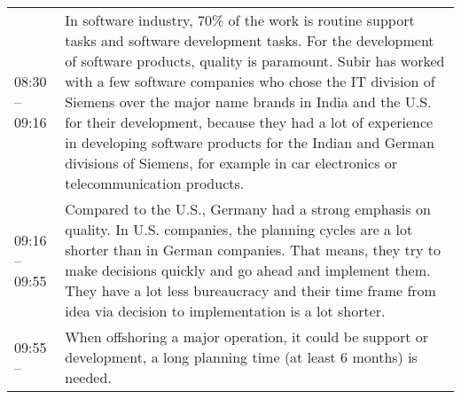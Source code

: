 \begin{appendix}
\begin{longtable}{l p{12.5cm}}
	08:30 -- 09:16&In software industry, 70\% of the work is routine support tasks and software development tasks. For the development of software products, quality is paramount. Subir has worked with a few software companies who chose the IT division of Siemens over the major name brands in India and the U.S. for their development, because they had a lot of experience in developing software products for the Indian and German divisions of Siemens, for example in car electronics or telecommunication products.\\
	09:16 -- 09:55&Compared to the U.S., Germany had a strong emphasis on quality. In U.S. companies, the planning cycles are a lot shorter than in German companies. That means, they try to make decisions quickly and go ahead and implement them. They have a lot less bureaucracy and their time frame from idea via decision to implementation is a lot shorter.\\
	09:55 -- &When offshoring a major operation, it could be support or development, a long planning time (at least 6 months) is needed.
\end{longtable}	

\end{appendix}	